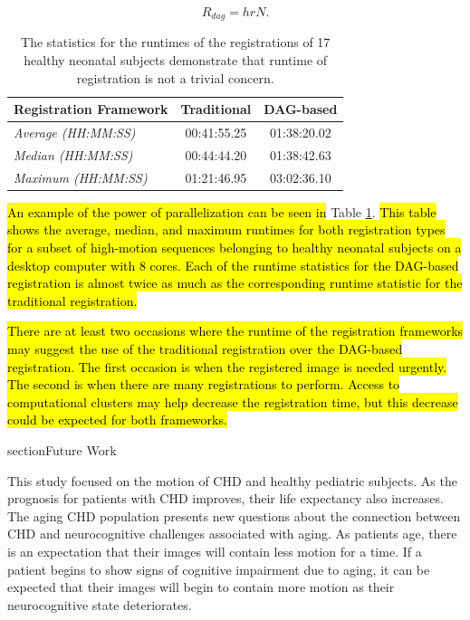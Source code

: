 \begin{equation}
R_{dag} = hrN.
\end{equation}

\begin{table}[]
\centering
\caption{The statistics for the runtimes of the registrations of 17 healthy neonatal subjects demonstrate that runtime of registration is not a trivial concern.}
\label{tab:runtime-example}
\begin{tabular}{|l|c|c|}
\hline
\textbf{Registration Framework} & \textbf{Traditional} & \textbf{DAG-based} \\ \hline
\textit{Average (HH:MM:SS)}     & 00:41:55.25          & 01:38:20.02        \\ \hline
\textit{Median (HH:MM:SS)}      & 00:44:44.20          & 01:38:42.63        \\ \hline
\textit{Maximum (HH:MM:SS)}     & 01:21:46.95          & 03:02:36.10        \\ \hline
\end{tabular}
\end{table}

\hl{An example of the power of parallelization can be seen in} Table \ref{tab:runtime-example}. \hl{This table shows the average, median, and maximum runtimes for both registration types for a subset of high-motion sequences belonging to healthy neonatal subjects on a desktop computer with 8 cores. Each of the runtime statistics for the DAG-based registration is almost twice as much as the corresponding runtime statistic for the traditional registration.}

\hl{There are at least two occasions where the runtime of the registration frameworks may suggest the use of the traditional registration over the DAG-based registration. The first occasion is when the registered image is needed urgently. The second is when there are many registrations to perform. Access to computational clusters may help decrease the registration time, but this decrease could be expected for both frameworks.}

section{Future Work}

This study focused on the motion of CHD and healthy pediatric subjects. As the prognosis for patients with CHD improves, their life expectancy also increases. The aging CHD population presents new questions about the connection between CHD and neurocognitive challenges associated with aging. As patients age, there is an expectation that their images will contain less motion for a time. If a patient begins to show signs of cognitive impairment due to aging, it can be expected that their images will begin to contain more motion as their neurocognitive state deteriorates. 

